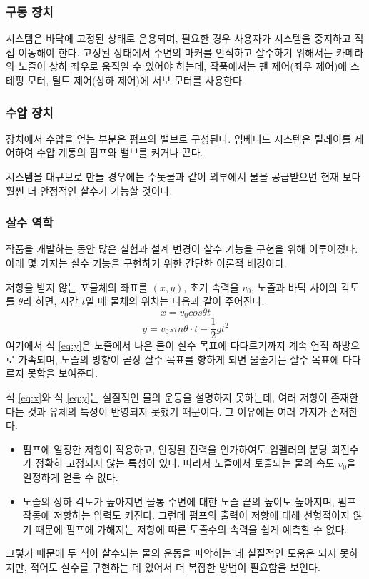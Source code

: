 \documentclass[chapter,11pt,oneside,openany]{xoblivoir}
\begin{document}
\subsubsection{구동 장치}
시스템은 바닥에 고정된 상태로 운용되며, 필요한 경우 사용자가 시스템을 중지하고 직접 이동해야 한다.
고정된 상태에서 주변의 마커를 인식하고 살수하기 위해서는 카메라와 노즐이 상하 좌우로 움직일 수 있어야 하는데,
작품에서는 팬 제어(좌우 제어)에 스테핑 모터, 틸트 제어(상하 제어)에 서보 모터를 사용한다.

\subsubsection{수압 장치}
장치에서 수압을 얻는 부분은 펌프와 밸브로 구성된다.
임베디드 시스템은 릴레이를 제어하여 수압 계통의 펌프와 밸브를
켜거나 끈다.

시스템을 대규모로 만들 경우에는 수돗물과 같이 외부에서 물을 공급받으면
현재 보다 훨씬 더 안정적인 살수가 가능할 것이다.

\subsubsection{살수 역학}
\label{water}

작품을 개발하는 동안 많은 실험과 설계 변경이 살수 기능을 구현을 위해 이루어졌다.
아래 몇 가지는 살수 기능을 구현하기 위한 간단한 이론적 배경이다.

저항을 받지 않는 포물체의 좌표를 $(x, y)$, 초기 속력을 $v_0$,
노즐과 바닥 사이의 각도를 $\theta$라 하면, 시간 $t$일 때
물체의 위치는 다음과 같이 주어진다.
\begin{equation}
\label{eq:x}
x = v_0 cos \theta t
\end{equation}
\vspace{-10mm}
\begin{equation}
\label{eq:y}
y = v_0 sin \theta \cdot t - \frac{1}{2}gt^2
\end{equation}
여기에서 식 \eqref{eq:y}은 노즐에서 나온 물이 살수 목표에 다다르기까지
계속 연직 하방으로 가속되며, 노즐의 방향이 곧장 살수 목표를 향하게 되면
물줄기는 살수 목표에 다다르지 못함을 보여준다.

식 \eqref{eq:x}와 식 \eqref{eq:y}는 실질적인 물의 운동을 설명하지 못하는데,
여러 저항이 존재한다는 것과 유체의 특성이 반영되지 못했기 때문이다.
그 이유에는 여러 가지가 존재한다.
\begin{itemize}
\item 펌프에 일정한 저항이 작용하고, 안정된 전력을 인가하여도
임펠러의 분당 회전수가 정확히 고정되지 않는 특성이 있다.
따라서 노즐에서 토출되는 물의 속도 $v_0$을 일정하게 얻을 수 없다.

\item 노즐의 상하 각도가 높아지면 물통 수면에 대한 노즐 끝의 높이도 높아지며,
펌프 작동에 저항하는 압력도 커진다. 그런데 펌프의 출력이 저항에 대해
선형적이지 않기 때문에 펌프에 가해지는 저항에 따른 토출수의 속력을
쉽게 예측할 수 없다.
\end{itemize}
그렇기 때문에 두 식이 살수되는 물의 운동을 파악하는 데
실질적인 도움은 되지 못하지만, 적어도 살수를 구현하는 데 있어서 더 복잡한 방법이
필요함을 보인다.
\end{document}
